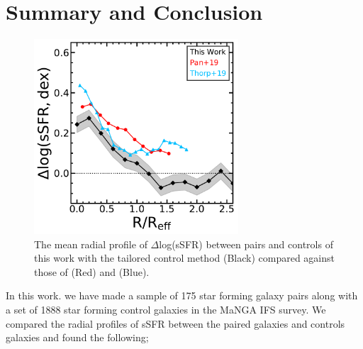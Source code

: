 \documentclass[iop,revtex4,twocolumn,apj,numberedappendix,appendixfloats]{emulateapj}
\begin{document}
\section{Summary and Conclusion}\label{sec:sum}

\begin{figure}
\centering
\includegraphics[width=3in]{fig/prof_comp.pdf}
\caption[]{The mean radial profile of $\Delta$log(sSFR) between pairs and controls of this work with the tailored control method (Black) compared against those of \citet{Pan:2019} (Red) and \citet{Thorp:2019} (Blue).}
\label{fig:prof_comp}
\end{figure}

In this work. we have made a sample of 175 star forming galaxy pairs along with a set of 1888 star forming control galaxies in the MaNGA IFS survey. We compared the radial profiles of sSFR between the paired galaxies and controls galaxies and found the following;
\end{document}
